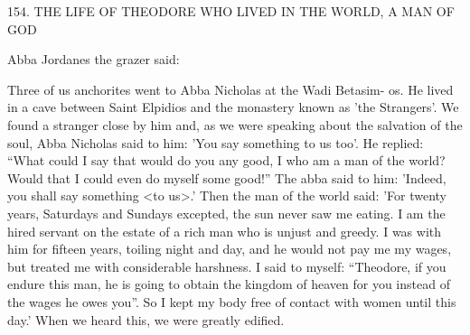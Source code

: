 154. THE LIFE OF THEODORE WHO LIVED IN
THE WORLD, A MAN OF GOD

Abba Jordanes the grazer said:

Three of us anchorites went to Abba Nicholas at the Wadi Betasim-
os. He lived in a cave between Saint Elpidios and the monastery
known as 'the Strangers'. We found a stranger close by him and, as
we were speaking about the salvation of the soul, Abba Nicholas
said to him: 'You say something to us too'. He replied: “What could
I say that would do you any good, I who am a man of the world?
Would that I could even do myself some good!” The abba said to
him: 'Indeed, you shall say something <to us>.' Then the man of
the world said: 'For twenty years, Saturdays and Sundays excepted,
the sun never saw me eating. I am the hired servant on the estate of
a rich man who is unjust and greedy. I was with him for fifteen
years, toiling night and day, and he would not pay me my wages,
but treated me with considerable harshness. I said to myself:
“Theodore, if you endure this man, he is going to obtain the
kingdom of heaven for you instead of the wages he owes you”. So
I kept my body free of contact with women until this day.' When
we heard this, we were greatly edified.

